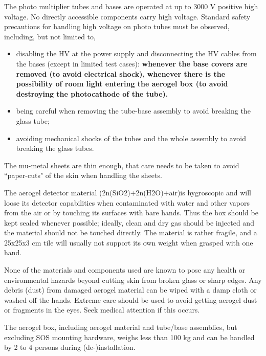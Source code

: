 The photo multiplier tubes and bases are operated at up to 3000 V
positive high voltage. No directly accessible components carry high
voltage. Standard safety precautions for handling high voltage on
photo tubes must be observed, including, but not limited to,
\begin{itemize}
\item{disabling the HV at the power supply and disconnecting the HV
cables from the bases (except in limited test cases):
{\bf whenever the base covers are removed (to avoid electrical shock),}
{\bf whenever there is the possibility of room light entering the
aerogel box (to avoid destroying the photocathode of the tube).}}
\item{being careful when removing the tube-base assembly to avoid breaking
the glass tube;}
\item{avoiding mechanical shocks of the tubes and the whole assembly to
avoid breaking the glass tubes.}
\end{itemize}

The mu-metal sheets are thin enough, that care needs to be taken to
avoid ``paper-cuts" of the skin when handling the sheets.

The aerogel detector material (2n(SiO2)+2n(H2O)+air)is hygroscopic
and will loose its detector capabilities when contaminated with water
and other vapors from the air or by touching its surfaces with bare
hands. Thus the box should be kept sealed whenever possible; ideally,
clean and dry gas should be injected and the material should not be
touched directly. The material is rather fragile, and a 25x25x3 cm
tile will usually not support its own weight when grasped with one
hand. 

None of the materials and components used are known to pose any
health or environmental hazards beyond cutting skin from broken glass
or sharp edges.  Any debris (dust) from damaged aerogel material can be wiped
with a damp cloth or washed off the hands.  Extreme care should be
used to avoid getting aerogel dust or fragments in the eyes.  Seek
medical attention if this occurs.

The aerogel box, including aerogel material and tube/base assemblies,
but excluding SOS mounting hardware, weighs less than 100 kg and
can be handled by 2 to 4 persons during (de-)installation.

